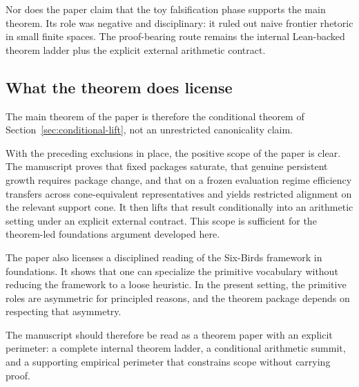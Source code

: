 Nor does the paper claim that the toy falsification phase supports the main
theorem. Its role was negative and disciplinary: it ruled out naive frontier
rhetoric in small finite spaces. The proof-bearing route remains the internal
Lean-backed theorem ladder plus the explicit external arithmetic contract.

\subsection*{What the theorem does license}

The main theorem of the paper is therefore the conditional theorem of Section~\ref{sec:conditional-lift}, not an unrestricted canonicality claim.

With the preceding exclusions in place, the positive scope of the paper is
clear. The manuscript proves that fixed packages saturate, that genuine
persistent growth requires package change, and that on a frozen evaluation
regime efficiency transfers across cone-equivalent representatives and yields
restricted alignment on the relevant support cone. It then lifts that result
conditionally into an arithmetic setting under an explicit external contract.
This scope is sufficient for the theorem-led foundations argument developed
here.

The paper also licenses a disciplined reading of the Six-Birds framework in
foundations. It shows that one can specialize the primitive vocabulary without
reducing the framework to a loose heuristic. In the present setting, the primitive roles
are asymmetric for principled reasons, and the theorem package depends on
respecting that asymmetry.

The manuscript should therefore be read as a theorem paper with an explicit
perimeter: a complete internal theorem ladder, a conditional arithmetic summit,
and a supporting empirical perimeter that constrains scope without carrying
proof.
